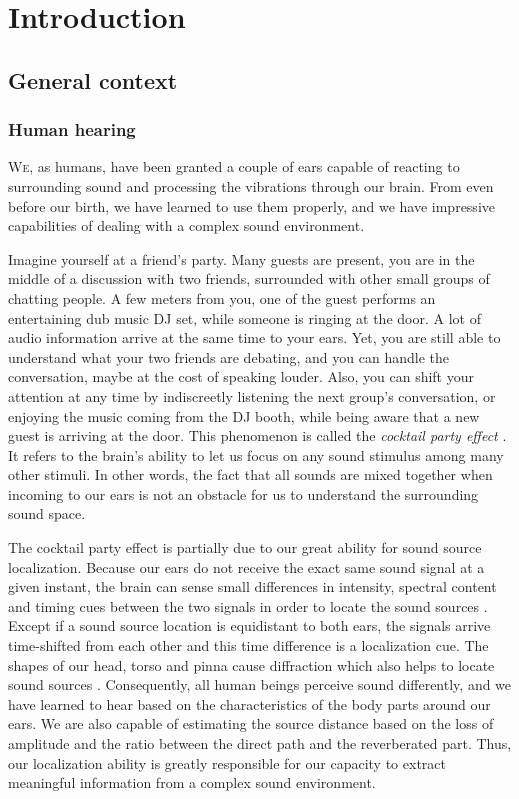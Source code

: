 \chapter{Introduction}
\label{chap:introduction}

\section{General context}

\subsection{Human hearing}

\lettrine{W}{e}, as humans, have been granted a couple of ears capable of reacting to surrounding sound and processing the vibrations through our brain. From even before our birth, we have learned to use them properly, and we have impressive capabilities of dealing with a complex sound environment.

Imagine yourself at a friend's party. Many guests are present, you are in the middle of a discussion with two friends, surrounded with other small groups of chatting people. A few meters from you, one of the guest performs an entertaining dub music DJ set, while someone is ringing at the door. A lot of audio information arrive at the same time to your ears. Yet, you are still able to understand what your two friends are debating, and you can handle the conversation, maybe at the cost of speaking louder. Also, you can shift your attention at any time by indiscreetly listening the next group's conversation, or enjoying the music coming from the DJ booth, while being aware that a new guest is arriving at the door. This phenomenon is called the \textit{cocktail party effect} \cite{arons_review_1992}. It refers to the brain's ability to let us focus on any sound stimulus among many other stimuli. In other words, the fact that all sounds are mixed together when incoming to our ears is not an obstacle for us to understand the surrounding sound space.

The cocktail party effect is partially due to our great ability for sound source localization. Because our ears do not receive the exact same sound signal at a given instant, the brain can sense small differences in intensity, spectral content and timing cues between the two signals in order to locate the sound sources \cite{bregman_auditory_1994}. Except if a sound source location is equidistant to both ears, the signals arrive time-shifted from each other and this time difference is a localization cue. The shapes of our head, torso and pinna cause diffraction which also helps to locate sound sources \cite{blauert_spatial_1997}. Consequently, all human beings perceive sound differently, and we have learned to hear based on the characteristics of the body parts around our ears. We are also capable of estimating the source distance based on the loss of amplitude and the ratio between the direct path and the reverberated part. Thus, our localization ability is greatly responsible for our capacity to extract meaningful information from a complex sound environment.

